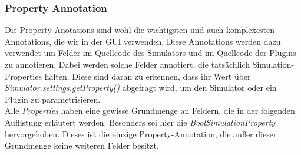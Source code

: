 \documentclass[a4paper, 11pt]{article} %
\begin{document}
\subsubsection{Property Annotation} %
\label{ssub:feld_annotation}
Die Property-Anotations sind wohl die wichtigsten und auch komplexesten Annotations, die wir in der GUI verwenden. Diese Annotations werden dazu verwendet um Felder im Quellcode des Simulators und im Quellcode der Plugins zu annotieren. Dabei werden solche Felder annotiert, die tatsächlich Simulation-Properties halten. Diese sind daran zu erkennen, dass ihr Wert über \emph{Simulator.settings.getProperty()} abgefragt wird, um den Simulator oder ein Plugin zu parametrisieren.\\

Alle \emph{Properties} haben eine gewisse Grundmenge an Feldern, die in der folgenden Auflistung erläutert werden. Besonders sei hier die \emph{BoolSimulationProperty} hervorgehoben. Dieses ist die einzige Property-Annotation, die außer dieser Grundmenge keine weiteren Felder besitzt.
\end{document}
